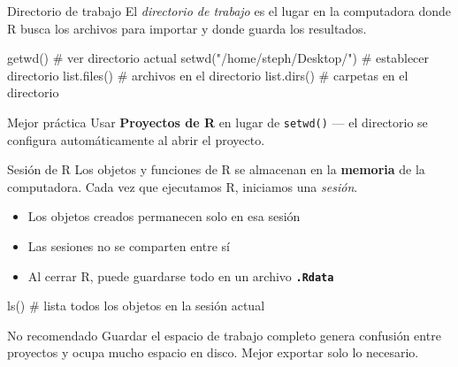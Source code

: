 \documentclass[
  9pt,
  ignorenonframetext,
]{beamer}
\newenvironment{Shaded}{\begin{snugshade}}{\end{snugshade}}
\newcommand{\CommentTok}[1]{\textcolor[rgb]{0.37,0.37,0.37}{#1}}
\newcommand{\FunctionTok}[1]{\textcolor[rgb]{0.28,0.35,0.67}{#1}}
\newcommand{\NormalTok}[1]{\textcolor[rgb]{0.00,0.23,0.31}{#1}}
\newcommand{\StringTok}[1]{\textcolor[rgb]{0.13,0.47,0.30}{#1}}
\providecommand{\tightlist}{%
  \setlength{\itemsep}{0pt}\setlength{\parskip}{0pt}}\usepackage{longtable,booktabs,array}
\begin{document}
\begin{frame}[fragile]{Directorio de trabajo}
\label{directorio-de-trabajo}
El \emph{directorio de trabajo} es el lugar en la computadora donde R
busca los archivos para importar y donde guarda los resultados.

\begin{Shaded}
\begin{Highlighting}[]
\FunctionTok{getwd}\NormalTok{()                          }\CommentTok{\# ver directorio actual}
\FunctionTok{setwd}\NormalTok{(}\StringTok{"/home/steph/Desktop/"}\NormalTok{)    }\CommentTok{\# establecer directorio}
\FunctionTok{list.files}\NormalTok{()                     }\CommentTok{\# archivos en el directorio}
\FunctionTok{list.dirs}\NormalTok{()                      }\CommentTok{\# carpetas en el directorio}
\end{Highlighting}
\end{Shaded}

\medskip

\begin{block}{Mejor práctica}
Usar \textbf{Proyectos de R} en lugar de \texttt{setwd()} — el directorio se configura automáticamente al abrir el proyecto.
\end{block}
\end{frame}

\begin{frame}[fragile]{Sesión de R}
\label{sesiuxf3n-de-r}
Los objetos y funciones de R se almacenan en la \textbf{memoria} de la
computadora. Cada vez que ejecutamos R, iniciamos una \emph{sesión}.

\begin{itemize}
\tightlist
\item
  Los objetos creados permanecen solo en esa sesión
\item
  Las sesiones no se comparten entre sí
\item
  Al cerrar R, puede guardarse todo en un archivo
  \textbf{\texttt{.Rdata}}
\end{itemize}

\begin{Shaded}
\begin{Highlighting}[]
\FunctionTok{ls}\NormalTok{()    }\CommentTok{\# lista todos los objetos en la sesión actual}
\end{Highlighting}
\end{Shaded}

\begin{alertblock}{No recomendado}
Guardar el espacio de trabajo completo genera confusión entre proyectos y ocupa mucho espacio en disco. Mejor exportar solo lo necesario.
\end{alertblock}
\end{frame}
\end{document}
